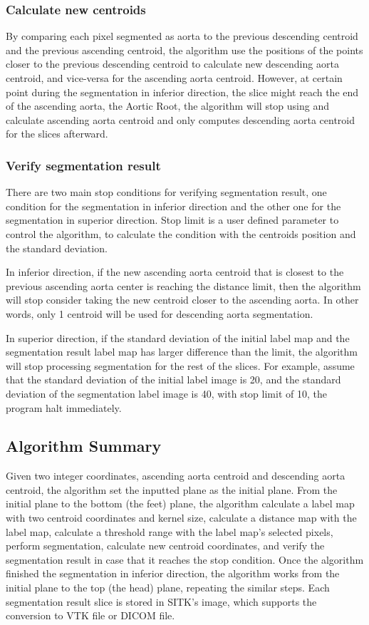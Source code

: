 \subsubsection{Calculate new centroids}
By comparing each pixel segmented as aorta to the previous descending centroid and the previous ascending centroid, the algorithm use the positions of the points closer to the previous descending centroid to calculate new descending aorta centroid, and vice-versa for the ascending aorta centroid. However, at certain point during the segmentation in inferior direction, the slice might reach the end of the ascending aorta, the Aortic Root, the algorithm will stop using and calculate ascending aorta centroid and only computes descending aorta centroid for the slices afterward.

\subsubsection{Verify segmentation result}
There are two main stop conditions for verifying segmentation result, one condition for the segmentation in inferior direction and the other one for the segmentation in superior direction. Stop limit is a user defined parameter to control the algorithm, to calculate the condition with the centroids position and the standard deviation.

In inferior direction, if the new ascending aorta centroid that is closest to the previous ascending aorta center is reaching the distance limit, then the algorithm will stop consider taking the new centroid closer to the ascending aorta. In other words, only 1 centroid will be used for descending aorta segmentation.

In superior direction, if the standard deviation of the initial label map and the segmentation result label map has larger difference than the limit, the algorithm will stop processing segmentation for the rest of the slices. For example, assume that the standard deviation of the initial label image is 20, and the standard deviation of the segmentation label image is 40, with stop limit of 10, the program halt immediately.

\subsection{Algorithm Summary}
Given two integer coordinates, ascending aorta centroid and descending aorta centroid, the algorithm set the inputted plane as the initial plane. From the initial plane to the bottom (the feet) plane, the algorithm calculate a label map with two centroid coordinates and kernel size, calculate a distance map with the label map, calculate a threshold range with the label map's selected pixels, perform segmentation, calculate new centroid coordinates, and verify the segmentation result in case that it reaches the stop condition. Once the algorithm finished the segmentation in inferior direction, the algorithm works from the initial plane to the top (the head) plane, repeating the similar steps. Each segmentation result slice is stored in SITK's image, which supports the conversion to VTK file or DICOM file.

